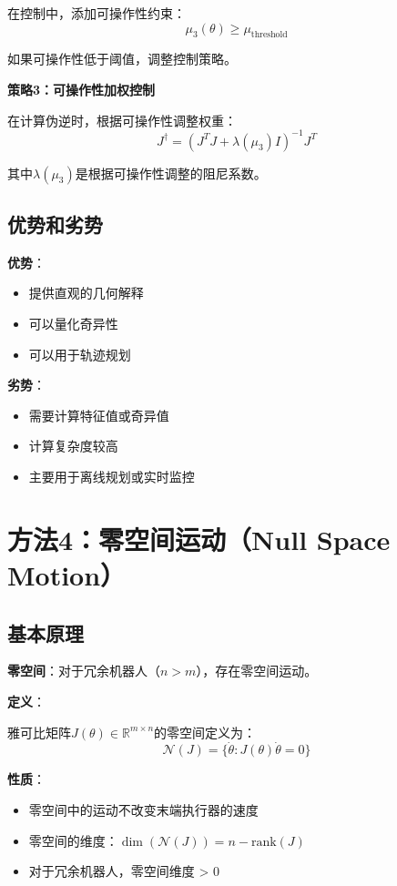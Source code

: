 \documentclass[12pt,a4paper]{article}
\begin{document}
在控制中，添加可操作性约束：
\begin{equation}
\mu_3(\theta) \geq \mu_{\text{threshold}}
\end{equation}

如果可操作性低于阈值，调整控制策略。

\textbf{策略3：可操作性加权控制}

在计算伪逆时，根据可操作性调整权重：
\begin{equation}
J^{\dagger} = (J^T J + \lambda(\mu_3) I)^{-1}J^T
\end{equation}

其中$\lambda(\mu_3)$是根据可操作性调整的阻尼系数。

\subsection{优势和劣势}

\textbf{优势}：
\begin{itemize}
\item 提供直观的几何解释
\item 可以量化奇异性
\item 可以用于轨迹规划
\end{itemize}

\textbf{劣势}：
\begin{itemize}
\item 需要计算特征值或奇异值
\item 计算复杂度较高
\item 主要用于离线规划或实时监控
\end{itemize}

\section{方法4：零空间运动（Null Space Motion）}

\subsection{基本原理}

\textbf{零空间}：对于冗余机器人（$n > m$），存在零空间运动。

\textbf{定义}：

雅可比矩阵$J(\theta) \in \mathbb{R}^{m \times n}$的零空间定义为：
\begin{equation}
\mathcal{N}(J) = \{\dot{\theta} : J(\theta)\dot{\theta} = 0\}
\end{equation}

\textbf{性质}：
\begin{itemize}
\item 零空间中的运动不改变末端执行器的速度
\item 零空间的维度：$\dim(\mathcal{N}(J)) = n - \text{rank}(J)$
\item 对于冗余机器人，零空间维度 > 0
\end{itemize}
\end{document}
